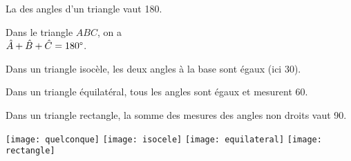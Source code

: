 \begin{myprop}
	La  des angles d'un triangle vaut 180\degree.
\end{myprop}


\begin{myexs}
	\begin{multicols}{2}
		\vspace*{1cm}
			Dans le triangle $ABC$, on a \\ $\hat{A} + \hat{B} + \hat{C} = 180\degree$.
		\vspace*{1cm}
		
		
			Dans un triangle isocèle, les deux angles à la base sont égaux (ici 30\degree).
			\vspace*{2.5cm}
		
		
			Dans un triangle équilatéral, tous les angles sont égaux et mesurent 60\degree.
			\vspace*{2.5cm}
			
			Dans un triangle rectangle, la somme des mesures des angles non droits vaut 90\degree.
			
			
		\begin{center}	
		\texttt{[image: quelconque]}	
		\texttt{[image: isocele]}	
		\texttt{[image: equilateral]}
		\texttt{[image: rectangle]}
		\end{center}
	\end{multicols}
\end{myexs}
